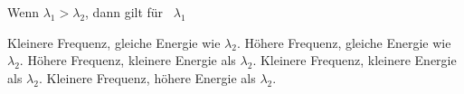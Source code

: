 \documentclass[11pt]{exam}
\begin{document}
\begin{questions}
\vspace{3mm}\question Wenn \( \lambda_1 > \lambda_2 \), dann gilt für  \( \lambda_1 \)

\begin{choices}
	\choice Kleinere Frequenz, gleiche Energie wie \( \lambda_2 \).
	\choice Höhere Frequenz, gleiche Energie wie \( \lambda_2 \).
	\choice Höhere Frequenz, kleinere Energie als \( \lambda_2 \).
	\choice Kleinere Frequenz, kleinere Energie als \( \lambda_2 \).
	\choice Kleinere Frequenz, höhere Energie als \( \lambda_2 \).
\end{choices}

\vspace{3mm}\end{questions}
\end{document}
